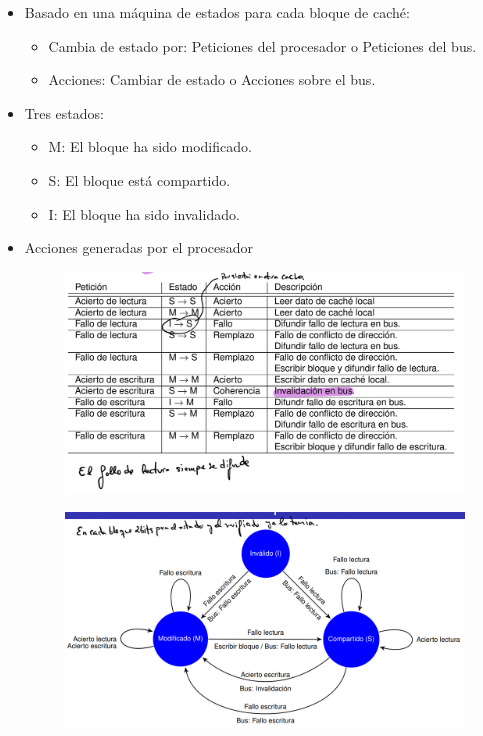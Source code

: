 \documentclass[12pt, twoside, openright]{report} %
\begin{document}
    \begin{itemize}
    \item
      Basado en una máquina de estados para cada bloque de caché:

      \begin{itemize}
      
      \item
        Cambia de estado por: Peticiones del procesador o Peticiones
        del bus.
      \item
        Acciones: Cambiar de estado o Acciones sobre el bus.
      \end{itemize}
    \item
      Tres estados:

      \begin{itemize}
      
      \item
        M: El bloque ha sido modificado.
      \item
        S: El bloque está compartido.
      \item
        I: El bloque ha sido invalidado.
      \end{itemize}
    \item
      Acciones generadas por el procesador
      \begin{figure}[H]
        {\includegraphics[scale=.2]{Untitled 49.png}}
      \end{figure}
      \begin{figure}[H]
        {\includegraphics[scale=.2]{Untitled 50.png}}

\end{figure}
\end{itemize}
\end{document}
